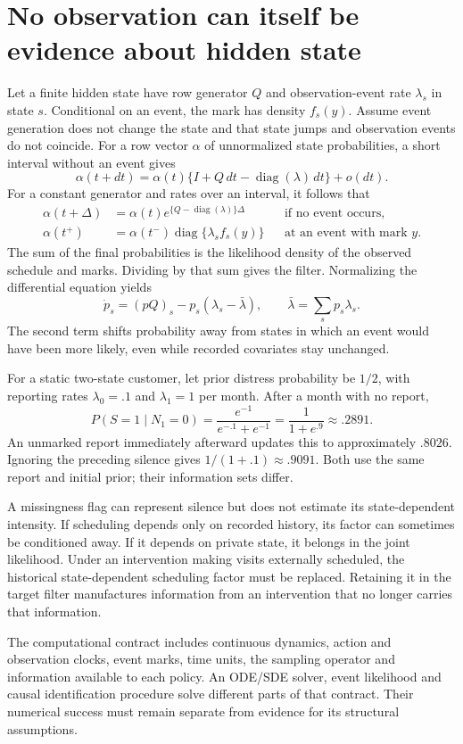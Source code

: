 \section{No observation can itself be evidence about hidden state}
\label{r3:no-event-filter}
Let a finite hidden state have row generator $Q$ and observation-event
rate $\lambda_s$ in state $s$. Conditional on an event, the mark has
density $f_s(y)$. Assume event generation does not change the state and
that state jumps and observation events do not coincide.
For a row vector $\alpha$ of unnormalized state probabilities, a short
interval without an event gives
\[
 \alpha(t+dt)=\alpha(t)\{I+Q\,dt-\operatorname{diag}(\lambda)\,dt\}
               +o(dt).
\]
For a constant generator and rates over an interval, it follows that
\begin{align}
 \alpha(t+\Delta)&=\alpha(t)
       e^{\{Q-\operatorname{diag}(\lambda)\}\Delta}
                    &&\text{if no event occurs},\\
 \alpha(t^+)&=\alpha(t^-)
       \operatorname{diag}\{\lambda_s f_s(y)\}
                    &&\text{at an event with mark }y .
 \label{r3:event-filter}
\end{align}
The sum of the final probabilities is the likelihood density of the
observed schedule and marks. Dividing by that sum gives the filter.
Normalizing the differential equation yields
\[
 \dot p_s=(pQ)_s-p_s(\lambda_s-\bar\lambda),
 \qquad \bar\lambda=\sum_s p_s\lambda_s .
\]
The second term shifts probability away from states in which an event
would have been more likely, even while recorded covariates stay unchanged.

For a static two-state customer, let prior distress probability be $1/2$,
with reporting rates $\lambda_0=.1$ and $\lambda_1=1$ per month.
After a month with no report,
\[
 P(S=1\mid N_1=0)=\frac{e^{-1}}{e^{-.1}+e^{-1}}
                 =\frac{1}{1+e^{.9}}\approx .2891.
\]
An unmarked report immediately afterward updates this to approximately
$.8026$. Ignoring the preceding silence gives $1/(1+.1)\approx .9091$.
Both use the same report and initial prior; their information sets differ.

A missingness flag can represent silence but does not estimate its
state-dependent intensity. If scheduling depends only on recorded history,
its factor can sometimes be conditioned away. If it depends on private
state, it belongs in the joint likelihood. Under an intervention making
visits externally scheduled, the historical state-dependent scheduling
factor must be replaced. Retaining it in the target filter manufactures
information from an intervention that no longer carries that information.

The computational contract includes continuous dynamics, action and
observation clocks, event marks, time units, the sampling operator and
information available to each policy. An ODE/SDE solver, event likelihood
and causal identification procedure solve different parts of that contract.
Their numerical success must remain separate from evidence for its
structural assumptions.
